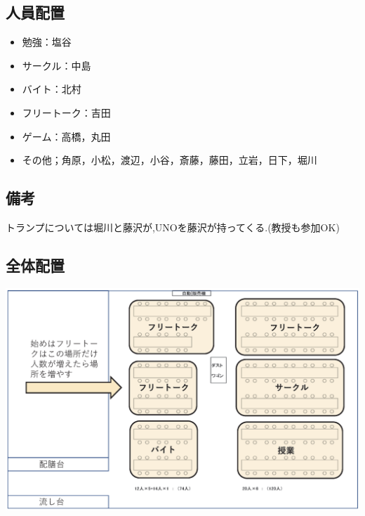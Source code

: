 \subsection{人員配置}
\begin{itemize}
\item 勉強：塩谷
\item サークル：中島
\item バイト：北村
\item フリートーク：吉田
\item ゲーム：高橋，丸田
\item その他；角原，小松，渡辺，小谷，斎藤，藤田，立岩，日下，堀川
\end{itemize}
\subsection{備考}
トランプについては堀川と藤沢が,UNOを藤沢が持ってくる.(教授も参加OK)
\subsection{全体配置}
\begin{center}
\includegraphics[width=15cm]{./13/hone.eps}
\end{center}
